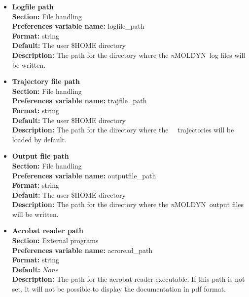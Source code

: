 \documentclass[a4paper,11pt]{report}
\newcommand{\NMOLDYN}{\textit{n}MOLDYN}
\begin{document}
\begin{itemize}
\item \textbf{Logfile path}\\
\textbf{Section:} File handling\\
\textbf{Preferences variable name:} logfile\_path\\
\textbf{Format:} string\\
\textbf{Default:} The user \$HOME directory\\
\textbf{Description:} The path for the directory where the \NMOLDYN\ log files will be written.

\item \textbf{Trajectory file path}\\
\textbf{Section:} File handling\\
\textbf{Preferences variable name:} trajfile\_path\\
\textbf{Format:} string\\
\textbf{Default:} The user \$HOME directory\\
\textbf{Description:} The path for the directory where the \MMTK\ \NetCDF\ trajectories will be loaded by default.

\item \textbf{Output file path}\\
\textbf{Section:} File handling\\
\textbf{Preferences variable name:} outputfile\_path\\
\textbf{Format:} string\\
\textbf{Default:} The user \$HOME directory\\
\textbf{Description:} The path for the directory where the \NMOLDYN\ output files will be written.

\item \textbf{Acrobat reader path}\\
\textbf{Section:} External programs\\
\textbf{Preferences variable name:} acroread\_path\\
\textbf{Format:} string\\
\textbf{Default:} \textit{None}\\
\textbf{Description:} The path for the acrobat reader executable. If this path is not set, it will not be possible to display the 
documentation in pdf format.


\end{itemize}
\end{document}
